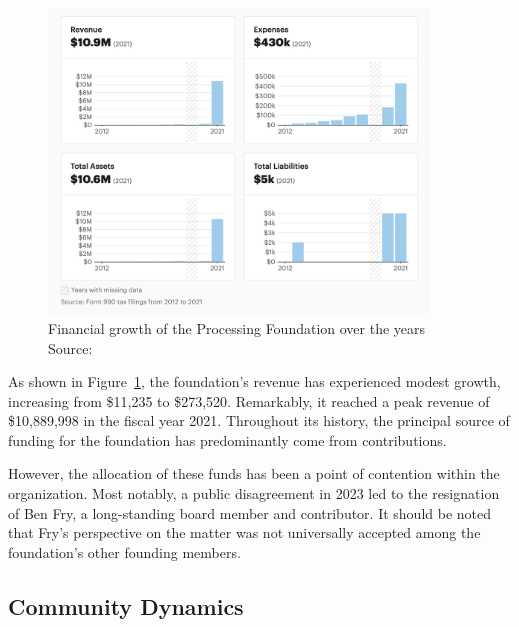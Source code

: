 \begin{figure}[h]
	\centering
	\includegraphics[width=0.9\textwidth]{images/foundation-finances.png}
	\caption{Financial growth of the Processing Foundation over the years Source: \parencite{ProcessingFoundationNonprofit2013}}
	\label{fig:foundation-finances}
\end{figure}

As shown in Figure~\ref{fig:foundation-finances}, the foundation's revenue has experienced modest growth, increasing from \$11,235 to \$273,520. Remarkably, it reached a peak revenue of \$10,889,998 in the fiscal year 2021. Throughout its history, the principal source of funding for the foundation has predominantly come from contributions.

However, the allocation of these funds has been a point of contention within the organization. Most notably, a public disagreement in 2023 led to the resignation of Ben Fry, a long-standing board member and contributor. It should be noted that Fry's perspective on the matter was not universally accepted among the foundation's other founding members. \parencite{benfry[@ben_fry]HaveMadeExtremely2023} \parencite{caseyreas[@reas]EarlierThisWeek2023} \parencite{danielshiffman[@shiffman]WouldPostNote2023}

\subsection{Community Dynamics}


